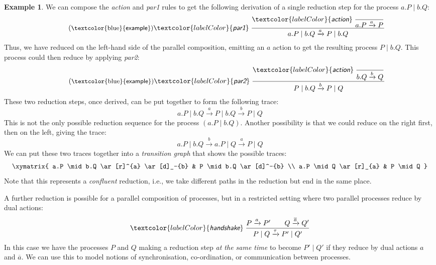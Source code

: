 \documentclass{article}
\newcommand{\exampleLabel}{\tag{\small{\textcolor{blue}{\textsf{example}}}}}
\theoremstyle{definition}
\newtheorem{example}{Example}
\newcommand{\trule}[1]{\textcolor{labelColor}{\textit{\textsf{#1}}}\;}
\begin{document}
\begin{example}
We can compose the \trule{action} and \trule{par1}
rules to get the following derivation of a single reduction
step for the process $a . P \mid b . Q$:
%
\begin{align*}
  \exampleLabel{}
  \trule{par1}\dfrac{\trule{action}
  \dfrac{}{a.P \xrightarrow{a} P}}{a.P \mid b.Q \xrightarrow{a} P \mid b.Q}
\end{align*}
%
Thus, we have reduced on the left-hand side of the parallel
composition, emitting an $a$ action to get the resulting process $P
\mid b . Q$. This process could then reduce by applying \trule{par2}:
%
\begin{align*}
  \exampleLabel{}
  \trule{par2}\dfrac{\trule{action}
   \dfrac{}{b.Q \xrightarrow{b} Q}}{P \mid b.Q \xrightarrow{b} P \mid Q}
\end{align*}
%
These two reduction steps, once derived, can be put together to form
the following trace:
%
\begin{equation*}
a.P \mid b.Q \xrightarrow{a} P \mid b.Q \xrightarrow{b} P \mid Q
\end{equation*}
%
This is not the only possible reduction sequence for
the process $(a.P \mid b.Q)$. Another possibility is that we could
reduce on the right first, then on the left, giving the trace:
%
\begin{equation*}
a.P \mid b.Q \xrightarrow{b} a.P \mid Q \xrightarrow{a} P \mid Q
\end{equation*}
%
We can put these two traces together into a \emph{transition graph} that shows
the possible traces:
%
\begin{equation*}
  \xymatrix{
    a.P \mid b.Q \ar[r]^{a} \ar[d]_-{b} & P \mid b.Q \ar[d]^-{b} \\
    a.P \mid Q \ar[r]_{a} & P \mid Q
    }
\end{equation*}
%
Note that this represents a \emph{confluent} reduction, i.e., we take
different paths in the reduction but end in the same place.
\end{example}

A further reduction is possible for a parallel composition of processes,
but in a restricted setting where two parallel processes reduce
by dual actions:
%
\begin{align*}
  \trule{handshake}\dfrac{P \xrightarrow{a} P' \qquad Q \xrightarrow{\overline{a}} Q'}
  {P \mid Q \xrightarrow{\tau} P' \mid Q'}
\end{align*}
%
In this case we have the processes $P$ and $Q$ making a reduction step
\emph{at the same time} to become $P' \mid Q'$ if they reduce by dual
actions $a$ and $\overline{a}$. We can use this to model notions of
synchronisation, co-ordination, or communication between processes.
\end{document}
